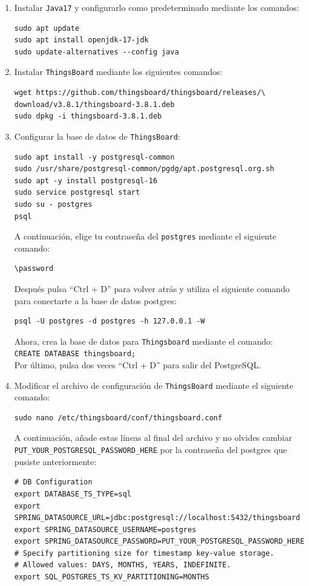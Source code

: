 \begin{enumerate}
    \item Instalar \texttt{Java17} y configurarlo como predeterminado mediante los comandos:
    \begin{verbatim}
sudo apt update
sudo apt install openjdk-17-jdk
sudo update-alternatives --config java
    \end{verbatim}

    \item Instalar \texttt{ThingsBoard} mediante los siguientes comandos:
    \begin{verbatim}
wget https://github.com/thingsboard/thingsboard/releases/\
download/v3.8.1/thingsboard-3.8.1.deb
sudo dpkg -i thingsboard-3.8.1.deb
    \end{verbatim}

    \item Configurar la base de datos de \texttt{ThingsBoard}:
    \begin{verbatim}
sudo apt install -y postgresql-common
sudo /usr/share/postgresql-common/pgdg/apt.postgresql.org.sh
sudo apt -y install postgresql-16
sudo service postgresql start
sudo su - postgres
psql
    \end{verbatim}
    A continuación, elige tu contraseña del \texttt{postgres} mediante el siguiente comando:
    \begin{verbatim}
\password
    \end{verbatim}
    Después pulsa ``Ctrl + D'' para volver atrás y utiliza el siguiente comando para conectarte a la base de datos postgres:
    \begin{verbatim}
psql -U postgres -d postgres -h 127.0.0.1 -W
    \end{verbatim}
    Ahora, crea la base de datos para \texttt{Thingsboard} mediante el comando: \\
    \texttt{CREATE DATABASE thingsboard;} \\
    Por último, pulsa dos veces ``Ctrl + D'' para salir del PostgreSQL.

    \item Modificar el archivo de configuración de \texttt{ThingsBoard} mediante el siguiente comando:
    \begin{verbatim}
sudo nano /etc/thingsboard/conf/thingsboard.conf
    \end{verbatim}
    A continuación, añade estas líneas al final del archivo y no olvides cambiar \\
    \texttt{PUT\_YOUR\_POSTGRESQL\_PASSWORD\_HERE} por la contraseña del postgres que pusiste anteriormente:
    \begin{verbatim}
# DB Configuration
export DATABASE_TS_TYPE=sql
export SPRING_DATASOURCE_URL=jdbc:postgresql://localhost:5432/thingsboard
export SPRING_DATASOURCE_USERNAME=postgres
export SPRING_DATASOURCE_PASSWORD=PUT_YOUR_POSTGRESQL_PASSWORD_HERE
# Specify partitioning size for timestamp key-value storage.
# Allowed values: DAYS, MONTHS, YEARS, INDEFINITE.
export SQL_POSTGRES_TS_KV_PARTITIONING=MONTHS
    \end{verbatim}


\end{enumerate}
